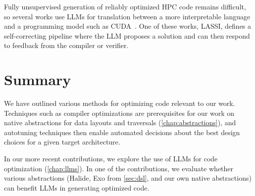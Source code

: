 Fully unsupervised generation of reliably optimized HPC code remains difficult, so several works use LLMs for translation between a more interpretable language and a programming model such as CUDA~\cite{palkowski2024gpt,dearing2024lassi}. One of these works, LASSI, defines a self-correcting pipeline where the LLM proposes a solution and can then respond to feedback from the compiler or verifier.
\section{Summary}\label{sec:methods-summary}

We have outlined various methods for optimizing code relevant to our work. Techniques such as compiler optimizations are prerequisites for our work on native abstractions for data layouts and traversals (\cref{chap:abstractions}), and autotuning techniques then enable automated decisions about the best design choices for a given target architecture.

In our more recent contributions, we explore the use of LLMs for code optimization (\cref{chap:llms}). In one of the contributions, we evaluate whether various abstractions (Halide, Exo from \cref{sec:dsl}, and our own native abstractions) can benefit LLMs in generating optimized code.
